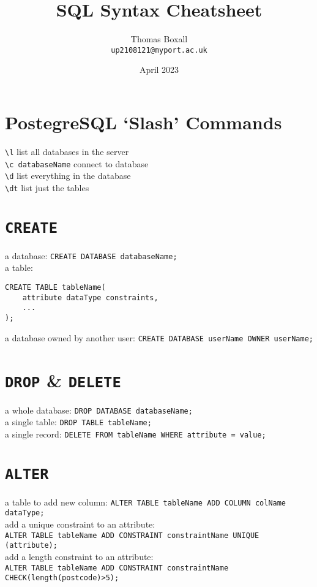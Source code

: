 \documentclass[a4paper,11pt]{article}
\title{SQL Syntax Cheatsheet}
\author{Thomas Boxall\\ \texttt{up2108121@myport.ac.uk}}
\date{April 2023}
\begin{document}
\maketitle
\thispagestyle{fancy}

\section{PostegreSQL `Slash' Commands}
\verb|\l| list all databases in the server\\
\verb|\c databaseName| connect to database\\
\verb|\d| list everything in the database\\
\verb|\dt| list just the tables

\section{\texttt{CREATE}}
a database: \verb|CREATE DATABASE databaseName;|\\
a table: 
\begin{verbatim}
CREATE TABLE tableName(
    attribute dataType constraints,
    ...
);
\end{verbatim}
a database owned by another user: \verb|CREATE DATABASE userName OWNER userName;|

\section{\texttt{DROP} \& \texttt{DELETE}}
a whole database: \verb|DROP DATABASE databaseName;|\\
a single table: \verb|DROP TABLE tableName;|\\
a single record: \verb|DELETE FROM tableName WHERE attribute = value;|

\section{\texttt{ALTER}}
a table to add new column: \verb|ALTER TABLE tableName ADD COLUMN colName dataType;|\\
add a unique constraint to an attribute:\\ \verb|ALTER TABLE tableName ADD CONSTRAINT constraintName UNIQUE (attribute);|\\
add a length constraint to an attribute:\\ \verb|ALTER TABLE tableName ADD CONSTRAINT constraintName CHECK(length(postcode)>5);|\\
\end{document}
